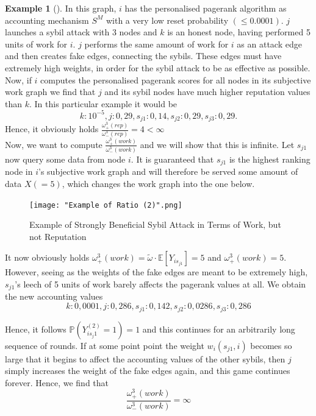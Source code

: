 \documentclass[11pt,a4paper]{article}
\theoremstyle{definition}
\theoremstyle{theorem}
\theoremstyle{proposition}
\theoremstyle{corollary}
\theoremstyle{lemma}
\theoremstyle{example}
\newtheorem{example}{Example}[section]
\theoremstyle{remark}
\begin{document}
\begin{example}[]
\noindent{}In this graph, $i$ has the personalised pagerank algorithm as accounting mechanism $S^M$ with a very low reset probability $(\leq{}0.0001)$. $j$ launches a sybil attack with 3 nodes and $k$ is an honest node, having performed 5 units of work for $i$. $j$ performs the same amount of work for $i$ as an attack edge and then creates fake edges, connecting the sybils. These edges must have extremely high weights, in order for the sybil attack to be as effective as possible. Now, if $i$ computes the personalised pagerank scores for all nodes in its subjective work graph we find that $j$ and its sybil nodes have much higher reputation values than $k$. In this particular example it would be 
\[
k:10^{-5}, j:0,29, s_{j1}:0,14, s_{j2}:0,29, s_{j3}:0,29.
\]
Hence, it obviously holds $\frac{\omega^3_{+}(rep)}{\omega^3_{-}(rep)} = 4 < \infty$ \vspace{1em}\\

\noindent{}Now, we want to compute $\frac{\omega^3_{+}(work)}{\omega^3_{-}(work)}$ and we will show that this is infinite. Let $s_{j1}$ now query some data from node $i$. It is guaranteed that $s_{j1}$ is the highest ranking node in $i$'s subjective work graph and will therefore be served some amount of data $X(=5)$, which changes the work graph into the one below. 

\begin{figure}[H]
\begin{center}
\texttt{[image: "Example of Ratio (2)".png]}
\caption{Example of Strongly Beneficial Sybil Attack in Terms of Work, but not Reputation}
\label{fig:Example of Strongly Beneficial Sybil Attack in Terms of Work, but not Reputation (2)}
\end{center}
\end{figure}

\noindent{}It now obviously holds $\omega^3_{+}(work) = \tilde{\omega}\cdot{}\mathbb{E}[Y_{is_{j1}}]=5$ and $\omega^3_{+}(work)=5$. However, seeing as the weights of the fake edges are meant to be extremely high, $s_{j1}$'s leech of 5 units of work barely affects the pagerank values at all. We obtain the new accounting values
\[
k:0,0001, j:0,286, s_{j1}:0,142, s_{j2}:0,0286, s_{j3}:0,286
\]

\noindent{}Hence, it follows $\mathbb{P}(Y^{(2)}_{is_j1}=1)=1$ and this continues for an arbitrarily long sequence of rounds. If at some point point the weight $w_i(s_{j1},i)$ becomes so large that it begins to affect the accounting values of the other sybils, then $j$ simply increases the weight of the fake edges again, and this game continues forever. Hence, we find that 
\[
\frac{\omega^3_{+}(work)}{\omega^3_{-}(work)}=\infty
\]
\end{example}
\end{document}
